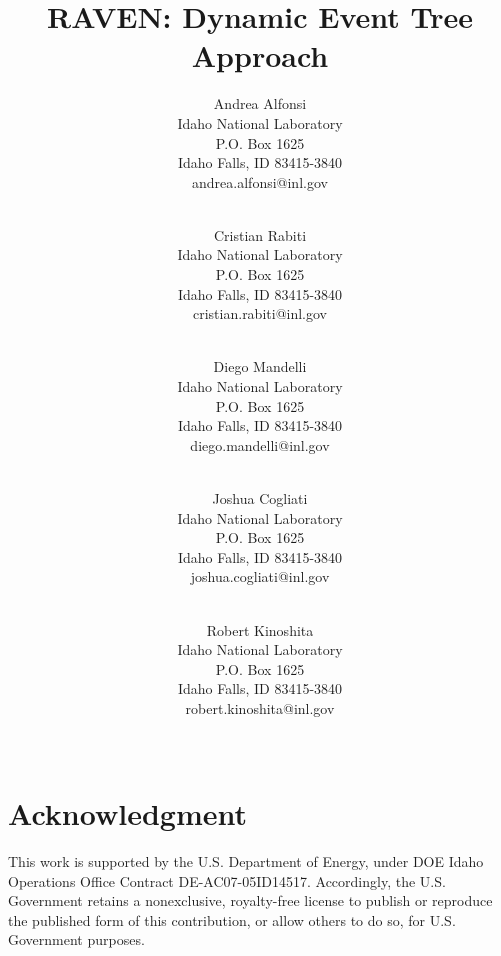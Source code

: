 \documentclass[pdf,ps2pdf,12pt]{INLreport}
\title{RAVEN: Dynamic Event Tree Approach}
\author{Andrea Alfonsi \\
	  Idaho National Laboratory\\
	  P.O. Box 1625\\
	  Idaho Falls, ID 83415-3840\\
	  andrea.alfonsi@inl.gov\\
	  \\
	  \and
         Cristian Rabiti \\
	  Idaho National Laboratory\\
	  P.O. Box 1625\\
	  Idaho Falls, ID 83415-3840\\
	  cristian.rabiti@inl.gov\\
	  \\
	  \and
         Diego Mandelli \\
	  Idaho National Laboratory\\
	  P.O. Box 1625\\
	  Idaho Falls, ID 83415-3840\\
	  diego.mandelli@inl.gov\\
	  \\
	  \and
         Joshua Cogliati \\
	  Idaho National Laboratory\\
	  P.O. Box 1625\\
	  Idaho Falls, ID 83415-3840\\
	  joshua.cogliati@inl.gov\\
	  \\
	  \and
         Robert Kinoshita \\
	  Idaho National Laboratory\\
	  P.O. Box 1625\\
	  Idaho Falls, ID 83415-3840\\
	  robert.kinoshita@inl.gov\\
	  \\
	 }
\date{}
\begin{document}
    \maketitle

%      


    \clearpage
    \section*{Acknowledgment}
	This work is supported by the U.S. Department of Energy, under DOE Idaho Operations Office Contract DE-AC07-05ID14517. Accordingly, the U.S. Government retains a nonexclusive, royalty-free license to publish or reproduce the published form of this contribution, or allow others to do so, for U.S. Government purposes.
%


    \cleardoublepage		%
    \tableofcontents
    \listoffigures
    \listoftables


\end{document}
